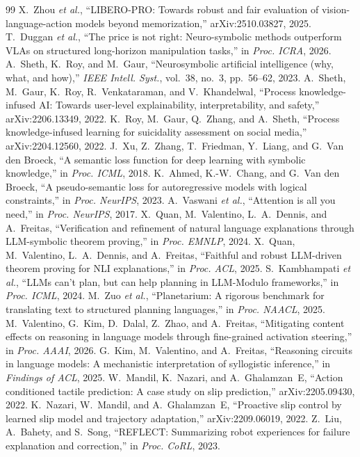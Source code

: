\documentclass[letterpaper, 10pt, conference]{IEEEtran}
\begin{document}
\begin{thebibliography}{99}
\scriptsize
\setlength{\itemsep}{0pt}
 X.~Zhou \emph{et al.}, ``LIBERO-PRO: Towards robust and fair evaluation of vision-language-action models beyond memorization,'' arXiv:2510.03827, 2025.
 T.~Duggan \emph{et al.}, ``The price is not right: Neuro-symbolic methods outperform VLAs on structured long-horizon manipulation tasks,'' in \emph{Proc. ICRA}, 2026.
 A.~Sheth, K.~Roy, and M.~Gaur, ``Neurosymbolic artificial intelligence (why, what, and how),'' \emph{IEEE Intell. Syst.}, vol.~38, no.~3, pp.~56--62, 2023.
 A.~Sheth, M.~Gaur, K.~Roy, R.~Venkataraman, and V.~Khandelwal, ``Process knowledge-infused AI: Towards user-level explainability, interpretability, and safety,'' arXiv:2206.13349, 2022.
 K.~Roy, M.~Gaur, Q.~Zhang, and A.~Sheth, ``Process knowledge-infused learning for suicidality assessment on social media,'' arXiv:2204.12560, 2022.
 J.~Xu, Z.~Zhang, T.~Friedman, Y.~Liang, and G.~Van den Broeck, ``A semantic loss function for deep learning with symbolic knowledge,'' in \emph{Proc. ICML}, 2018.
 K.~Ahmed, K.-W.~Chang, and G.~Van den Broeck, ``A pseudo-semantic loss for autoregressive models with logical constraints,'' in \emph{Proc. NeurIPS}, 2023.
 A.~Vaswani \emph{et al.}, ``Attention is all you need,'' in \emph{Proc. NeurIPS}, 2017.
 X.~Quan, M.~Valentino, L.~A.~Dennis, and A.~Freitas, ``Verification and refinement of natural language explanations through LLM-symbolic theorem proving,'' in \emph{Proc. EMNLP}, 2024.
 X.~Quan, M.~Valentino, L.~A.~Dennis, and A.~Freitas, ``Faithful and robust LLM-driven theorem proving for NLI explanations,'' in \emph{Proc. ACL}, 2025.
 S.~Kambhampati \emph{et al.}, ``LLMs can't plan, but can help planning in LLM-Modulo frameworks,'' in \emph{Proc. ICML}, 2024.
 M.~Zuo \emph{et al.}, ``Planetarium: A rigorous benchmark for translating text to structured planning languages,'' in \emph{Proc. NAACL}, 2025.
 M.~Valentino, G.~Kim, D.~Dalal, Z.~Zhao, and A.~Freitas, ``Mitigating content effects on reasoning in language models through fine-grained activation steering,'' in \emph{Proc. AAAI}, 2026.
 G.~Kim, M.~Valentino, and A.~Freitas, ``Reasoning circuits in language models: A mechanistic interpretation of syllogistic inference,'' in \emph{Findings of ACL}, 2025.
 W.~Mandil, K.~Nazari, and A.~Ghalamzan~E, ``Action conditioned tactile prediction: A case study on slip prediction,'' arXiv:2205.09430, 2022.
 K.~Nazari, W.~Mandil, and A.~Ghalamzan~E, ``Proactive slip control by learned slip model and trajectory adaptation,'' arXiv:2209.06019, 2022.
 Z.~Liu, A.~Bahety, and S.~Song, ``REFLECT: Summarizing robot experiences for failure explanation and correction,'' in \emph{Proc. CoRL}, 2023.
\end{thebibliography}
\end{document}
